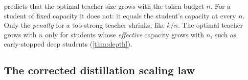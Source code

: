 \begin{remark}\label{rem:e2}
 predicts that the optimal teacher size grows with the token budget $n$. For a student of
fixed capacity it does not: it equals the student's capacity at every $n$. Only the \emph{penalty} for a
too-strong teacher shrinks, like $k/n$. The optimal teacher grows with $n$ only for students whose
\emph{effective} capacity grows with $n$, such as early-stopped deep students (\cref{thm:depth}).
\end{remark}

\subsection{The corrected distillation scaling law}\label{sec:law-law}

